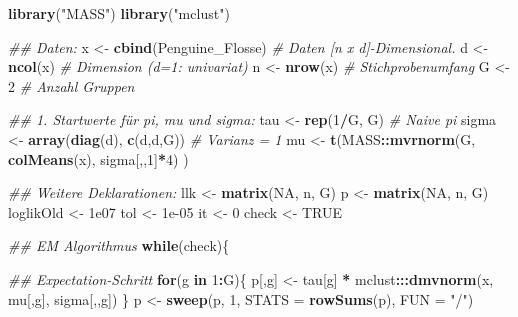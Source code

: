 \documentclass[
]{book}
\newenvironment{Shaded}{\begin{snugshade}}{\end{snugshade}}
\newcommand{\CommentTok}[1]{\textcolor[rgb]{0.56,0.35,0.01}{\textit{#1}}}
\newcommand{\ControlFlowTok}[1]{\textcolor[rgb]{0.13,0.29,0.53}{\textbf{#1}}}
\newcommand{\DataTypeTok}[1]{\textcolor[rgb]{0.13,0.29,0.53}{#1}}
\newcommand{\DecValTok}[1]{\textcolor[rgb]{0.00,0.00,0.81}{#1}}
\newcommand{\FloatTok}[1]{\textcolor[rgb]{0.00,0.00,0.81}{#1}}
\newcommand{\KeywordTok}[1]{\textcolor[rgb]{0.13,0.29,0.53}{\textbf{#1}}}
\newcommand{\NormalTok}[1]{#1}
\newcommand{\OperatorTok}[1]{\textcolor[rgb]{0.81,0.36,0.00}{\textbf{#1}}}
\newcommand{\OtherTok}[1]{\textcolor[rgb]{0.56,0.35,0.01}{#1}}
\newcommand{\StringTok}[1]{\textcolor[rgb]{0.31,0.60,0.02}{#1}}
\begin{document}
\begin{Shaded}
\begin{Highlighting}[]
\KeywordTok{library}\NormalTok{(}\StringTok{"MASS"}\NormalTok{)}
\KeywordTok{library}\NormalTok{(}\StringTok{"mclust"}\NormalTok{)}

\CommentTok{## Daten:}
\NormalTok{x <-}\StringTok{ }\KeywordTok{cbind}\NormalTok{(Penguine_Flosse) }\CommentTok{# Daten [n x d]-Dimensional. }
\NormalTok{d <-}\StringTok{ }\KeywordTok{ncol}\NormalTok{(x)                }\CommentTok{# Dimension (d=1: univariat)}
\NormalTok{n <-}\StringTok{ }\KeywordTok{nrow}\NormalTok{(x)                }\CommentTok{# Stichprobenumfang}
\NormalTok{G <-}\StringTok{ }\DecValTok{2}                      \CommentTok{# Anzahl Gruppen}


\CommentTok{## 1. Startwerte für pi, mu und sigma:}
\NormalTok{tau   <-}\StringTok{ }\KeywordTok{rep}\NormalTok{(}\DecValTok{1}\OperatorTok{/}\NormalTok{G, G)              }\CommentTok{# Naive pi}
\NormalTok{sigma <-}\StringTok{ }\KeywordTok{array}\NormalTok{(}\KeywordTok{diag}\NormalTok{(d), }\KeywordTok{c}\NormalTok{(d,d,G)) }\CommentTok{# Varianz = 1}
\NormalTok{mu    <-}\StringTok{ }\KeywordTok{t}\NormalTok{(MASS}\OperatorTok{::}\KeywordTok{mvrnorm}\NormalTok{(G, }\KeywordTok{colMeans}\NormalTok{(x), sigma[,,}\DecValTok{1}\NormalTok{]}\OperatorTok{*}\DecValTok{4}\NormalTok{) )}

\CommentTok{## Weitere Deklarationen:}
\NormalTok{llk       <-}\StringTok{ }\KeywordTok{matrix}\NormalTok{(}\OtherTok{NA}\NormalTok{, n, G)}
\NormalTok{p         <-}\StringTok{ }\KeywordTok{matrix}\NormalTok{(}\OtherTok{NA}\NormalTok{, n, G)  }
\NormalTok{loglikOld <-}\StringTok{ }\FloatTok{1e07}
\NormalTok{tol       <-}\StringTok{ }\FloatTok{1e-05}
\NormalTok{it        <-}\StringTok{ }\DecValTok{0}
\NormalTok{check     <-}\StringTok{ }\OtherTok{TRUE} 


\CommentTok{## EM Algorithmus}
\ControlFlowTok{while}\NormalTok{(check)\{}
  
  \CommentTok{## Expectation-Schritt }
  \ControlFlowTok{for}\NormalTok{(g }\ControlFlowTok{in} \DecValTok{1}\OperatorTok{:}\NormalTok{G)\{}
\NormalTok{    p[,g] <-}\StringTok{ }\NormalTok{tau[g] }\OperatorTok{*}\StringTok{ }\NormalTok{mclust}\OperatorTok{:::}\KeywordTok{dmvnorm}\NormalTok{(x, mu[,g], sigma[,,g])}
\NormalTok{  \}}
\NormalTok{  p <-}\StringTok{ }\KeywordTok{sweep}\NormalTok{(p, }\DecValTok{1}\NormalTok{, }\DataTypeTok{STATS =} \KeywordTok{rowSums}\NormalTok{(p), }\DataTypeTok{FUN =} \StringTok{"/"}\NormalTok{)}
  

\end{Highlighting}
\end{Shaded}
\end{document}
